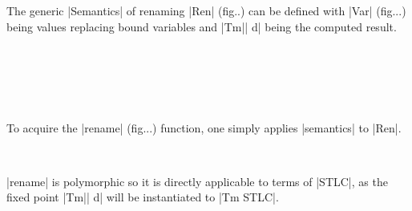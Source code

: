 \documentclass[sigplan,review,fleqn]{acmart}
\renewcommand{\verb}{\collectverb{\color{AgdaFunction}}}
\newcommand{\name}{\collectverb{\color{AgdaSymbol}}}
\begin{document}
The generic \verb|Semantics| of renaming \verb|Ren| (fig..) can be defined with \verb|Var| (fig...) being values replacing bound variables and \verb|Tm|\name| d| being the computed result.
\begin{code}
	\>[0]\AgdaSpace{}%
	\AgdaSpace{}%
	\AgdaSymbol{:}\AgdaSpace{}%
	\AgdaSpace{}%
	\AgdaSpace{}%
	\AgdaSpace{}%
	\AgdaSpace{}%
	\AgdaSpace{}%
	\AgdaSpace{}%
	\<%
	\\
	\>[0][@{}l@{\AgdaIndent{0}}]%
	\>[2]\AgdaSpace{}%
	\AgdaSymbol{:}\AgdaSpace{}%
	\AgdaSpace{}%
	\AgdaSpace{}%
	\AgdaSymbol{(}\AgdaSpace{}%
	\AgdaSpace{}%
	\AgdaSymbol{)}\<%
	\\
	\>[2]\AgdaSpace{}%
	\AgdaSymbol{:}\AgdaSpace{}%
	\AgdaSpace{}%
	\AgdaSpace{}%
	\AgdaSpace{}%
	\AgdaSpace{}%
	\AgdaSpace{}%
	\AgdaSpace{}%
	\AgdaSymbol{(}\AgdaSpace{}%
	\AgdaSpace{}%
	\AgdaSymbol{)}\<%
	\\
	\\[\AgdaEmptyExtraSkip]%
	\>[0]\AgdaSpace{}%
	\AgdaSymbol{:}\AgdaSpace{}%
	\AgdaSpace{}%
	\AgdaSpace{}%
	\AgdaSpace{}%
	\AgdaSymbol{(}\AgdaSpace{}%
	\AgdaSymbol{)}\<%
	
\end{code}
To acquire the \verb|rename| (fig...) function, one simply applies \verb|semantics| to \verb|Ren|.
\begin{code}
\>[0]\AgdaSpace{}%
\AgdaSymbol{:}\AgdaSpace{}%
\AgdaSymbol{(}\AgdaSpace{}%
\AgdaSpace{}%
\AgdaSpace{}%
\AgdaSpace{}%
\AgdaSpace{}%
\AgdaSpace{}%
\AgdaSymbol{)}\AgdaSpace{}
\AgdaSpace{}%
\AgdaSpace{}%
\AgdaSpace{}%
\AgdaSpace{}%
\AgdaSpace{}%
\AgdaSpace{}%
\AgdaSpace{}%
\AgdaSpace{}%
\AgdaSpace{}%
\<%
\\
\>[0]\AgdaSpace{}%
\AgdaSpace{}%
\AgdaSpace{}%
\AgdaSymbol{=}\AgdaSpace{}%
\AgdaSpace{}%
\AgdaSpace{}%
\AgdaSpace{}%
\<%
\end{code}
\verb|rename| is polymorphic so it is directly applicable to terms of \verb|STLC|, as the fixed point \verb|Tm|\name| d| will be instantiated to \verb|Tm STLC|. 
\end{document}
